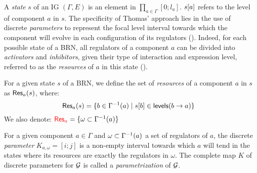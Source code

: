 A \emph{state} $s$ of an IG $(\Gamma, E)$ is an element in $\prod_{a \in \Gamma} [0;l_a]$.
${s[a]}$ refers to the level of component $a$ in $s$.
The specificity of Thomas' approach lies in the use of discrete \emph{parameters} to represent the
focal level interval towards which the component will evolve in each configuration of its regulators
().
Indeed, for each possible state of a BRN, all regulators of a component $a$ can be divided into
\emph{activators} and \emph{inhibitors}, given their type of interaction and expression level,
referred to as the \emph{resources} of $a$ in this state ().

\begin{definition}\label{def:resources}
For a given state $s$ of a BRN, we define the set of \emph{resources} of a component $a$ in $s$ as $\mathsf{Res}_{a}(s)$, where:
$$\mathsf{Res}_{a}(s) = \{ b \in \Gamma^{-1}(a) \mid {s[b]} \in \mathsf{levels}(b\rightarrow a) \}$$
We also denote: $\textcolor{red}{\mathsf{Res}_{a}} = \{ \omega \subset \Gamma^{-1}(a) \}$
\end{definition}

\begin{definition}\label{def:param}
For a given component $a \in \Gamma$ and $\omega \subset \Gamma^{-1}(a)$ a set of regulators of $a$,
the discrete \emph{parameter} $K_{a,\omega} = [i; j]$ is a non-empty interval towards which $a$ will tend
in the states where its resources are exactly the regulators in $\omega$.
The complete map $K$ of discrete parameters for $\mathcal{G}$ is called a \emph{parametrization} of $\mathcal{G}$.
\end{definition}


